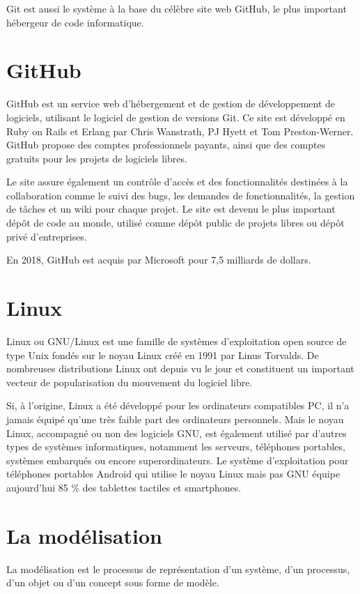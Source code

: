 Git est aussi le système à la base du célèbre site web GitHub,
le plus important hébergeur de code informatique.

\section{GitHub}\label{sec:github-1}
GitHub est un service web d'hébergement et de gestion de développement de logiciels,
utilisant le logiciel de gestion de versions Git.
Ce site est développé en Ruby on Rails et Erlang par Chris Wanstrath, PJ Hyett et
Tom Preston-Werner. GitHub propose des comptes professionnels payants,
ainsi que des comptes gratuits pour les projets de logiciels libres.

Le site assure également un contrôle d'accès et des fonctionnalités destinées à
la collaboration comme le suivi des bugs, les demandes de fonctionnalités, la gestion
de tâches et un wiki pour chaque projet. Le site est devenu le plus important dépôt de
code au monde, utilisé comme dépôt public de projets libres ou dépôt privé d'entreprises.

En 2018, GitHub est acquis par Microsoft pour 7,5 milliards de dollars.

\section{Linux}\label{sec:linux}
Linux ou GNU/Linux est une famille de systèmes d'exploitation open source de type
Unix fondés sur le noyau Linux créé en 1991 par Linus Torvalds. De nombreuses distributions
Linux ont depuis vu le jour et constituent un important vecteur de popularisation du mouvement
du logiciel libre.

Si, à l'origine, Linux a été développé pour les ordinateurs compatibles PC, il n'a jamais équipé
qu'une très faible part des ordinateurs personnels. Mais le noyau Linux, accompagné ou non des logiciels
GNU, est également utilisé par d'autres types de systèmes informatiques, notamment les serveurs,
téléphones portables, systèmes embarqués ou encore superordinateurs. Le système d'exploitation pour
téléphones portables Android qui utilise le noyau Linux mais pas GNU équipe aujourd'hui
85 \% des tablettes tactiles et smartphones.

\section{La modélisation}\label{sec:modelisation}
La modélisation est le processus de représentation d'un système,
d'un processus, d'un objet ou d'un concept sous forme de modèle.


